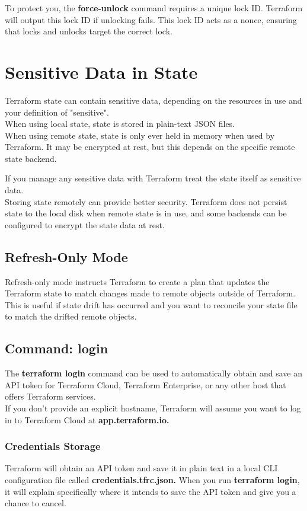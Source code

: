 \documentclass[12pt, letterpaper, twoside]{article}
\begin{document}
To protect you, the \textbf{force-unlock} command requires a unique lock ID. Terraform will output this lock ID if 
unlocking fails. This lock ID acts as a nonce, ensuring that locks and unlocks target the correct lock.

\section{Sensitive Data in State}
Terraform state can contain sensitive data, depending on the resources in use and your definition of "sensitive".\\

When using local state, state is stored in plain-text JSON files.\\

When using remote state, state is only ever held in memory when used by Terraform. It may be encrypted at rest,
but this depends on the specific remote state backend.

If you manage any sensitive data with Terraform treat the state itself as sensitive data.\\

Storing state remotely can provide better security. Terraform does not persist state to the local disk when remote 
state is in use, and some backends can be configured to encrypt the state data at rest.

\subsection{Refresh-Only Mode}
Refresh-only mode instructs Terraform to create a plan that updates the Terraform state to match changes made 
to remote objects outside of Terraform. This is useful if state drift has occurred and you want to 
reconcile your state file to match the drifted remote objects.

\subsection{Command: login}
The \textbf{terraform login} command can be used to automatically obtain and save an API token for Terraform Cloud, 
Terraform Enterprise, or any other host that offers Terraform services.\\

If you don't provide an explicit hostname, Terraform will assume you want to log in to Terraform Cloud at 
\textbf{app.terraform.io.}

\subsubsection{Credentials Storage}
Terraform will obtain an API token and save it in plain text in a local CLI configuration file called 
\textbf{credentials.tfrc.json.} When you run \textbf{terraform login}, it will explain specifically where 
it intends to save the API token and give you a chance to cancel.\\
\end{document}
